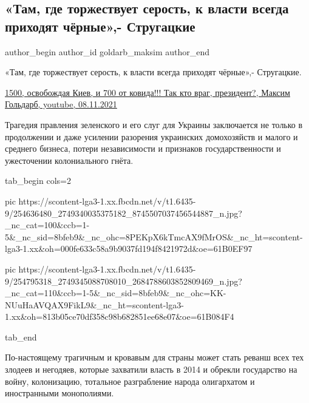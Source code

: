  
 
 
 
 
 
\subsection{«Там, где торжествует серость, к власти всегда приходят чёрные»,- Стругацкие}
\label{sec:09_11_2021.fb.goldarb_maksim.1.strugackie_ukraina_revansh}
 
\ifcmt
 author_begin
   author_id goldarb_maksim
 author_end
\fi

«Там, где торжествует серость, к власти всегда приходят чёрные»,- Стругацкие. 

\href{https://youtu.be/X-00R13myMM}{%
1500, освобождая Киев, и 700 от ковида!!! Так кто враг, президент?, Максим Гольдарб, youtube, %
08.11.2021%
}

Трагедия правления зеленского и его слуг для Украины заключается не только в
продолжении и даже усилении разорения украинских домохозяйств и малого и
среднего бизнеса, потери независимости и признаков государственности и
ужесточении колониального гнёта. 

\ifcmt
  tab_begin cols=2

     pic https://scontent-lga3-1.xx.fbcdn.net/v/t1.6435-9/254636480_2749340035375182_8745507037456544887_n.jpg?_nc_cat=100&ccb=1-5&_nc_sid=8bfeb9&_nc_ohc=8PEKpX6kTmcAX9fMrOS&_nc_ht=scontent-lga3-1.xx&oh=000fe633c58a9b9037fd194f8421972d&oe=61B0EF97

     pic https://scontent-lga3-1.xx.fbcdn.net/v/t1.6435-9/254795318_2749345088708010_2684788603852809469_n.jpg?_nc_cat=110&ccb=1-5&_nc_sid=8bfeb9&_nc_ohc=KK-NUuHaAVQAX9FikL9&_nc_ht=scontent-lga3-1.xx&oh=813b05ce70df358c98b682851ee68e07&oe=61B084F4

  tab_end
\fi

По-настоящему трагичным и кровавым для страны может стать реванш всех тех
злодеев и негодяев, которые захватили власть в 2014 и обрекли государство на
войну, колонизацию, тотальное разграбление народа олигархатом и иностранными
монополиями. 

